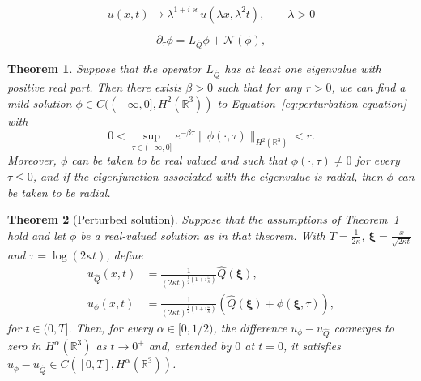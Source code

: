 \documentclass[10pt,a4paper]{amsart}
\newtheorem{theorem}{Theorem}
\begin{document}
\begin{equation}\label{scaling2}
  u(x,t)\to\lambda^{1+i\varkappa}u(\lambda x,\lambda^{2}t),\qquad\lambda>0
\end{equation}

\begin{equation}\label{eq:perturbation-equation}
  \partial_\tau\phi=L_{\hat{Q}}\phi+\mathcal{N}(\phi),
\end{equation}

\begin{theorem}\label{thm:decaying-solution}
  Suppose that the operator \(L_{\hat{Q}}\) has at least one
  eigenvalue with positive real part. Then there exists \(\beta > 0\)
  such that for any \(r > 0\), we can find a mild solution
  \(\phi \in C((-\infty, 0], H^{2}(\mathbb{R}^{3}))\) to
  Equation~\eqref{eq:perturbation-equation} with
  \begin{equation*}
    0 < \sup_{\tau \in (-\infty, 0]} e^{-\beta\tau}\|\phi(\cdot, \tau)\|_{H^{2}(\mathbb{R}^{3})} < r.
  \end{equation*}
  Moreover, \(\phi\) can be taken to be real valued and such that
  \(\phi(\cdot, \tau) \neq 0\) for every \(\tau \leq 0\), and if the
  eigenfunction associated with the eigenvalue is radial, then
  \(\phi\) can be taken to be radial.
\end{theorem}

\begin{theorem}[Perturbed solution]\label{thm:perturbed-solution}
  Suppose that the assumptions of Theorem~\ref{thm:decaying-solution}
  hold and let \(\phi\) be a real-valued solution as in that theorem.
  With
  \(T = \frac{1}{2\kappa}\), \(\bm{\xi} = \frac{x}{\sqrt{2\kappa t}}\)
  and \(\tau = \log(2\kappa t)\), define
  \begin{align*}
    u_{\hat{Q}}(x, t) &= \frac{1}{(2\kappa t)^{\frac{1}{2}\left(1 + i\frac{\omega}{\kappa}\right)}}\hat{Q}(\bm{\xi}),\\
    u_{\phi}(x, t) &= \frac{1}{(2\kappa t)^{\frac{1}{2}\left(1 + i\frac{\omega}{\kappa}\right)}}\left(\hat{Q}(\bm{\xi}) + \phi(\bm{\xi}, \tau)\right),
  \end{align*}
  for \(t \in (0, T]\). Then, for every \(\alpha \in [0, 1 / 2)\), the
  difference \(u_{\phi} - u_{\hat{Q}}\) converges to zero in
  \(H^{\alpha}(\mathbb{R}^{3})\) as \(t \to 0^{+}\) and, extended by
  \(0\) at \(t = 0\), it satisfies
  \(u_{\phi} - u_{\hat{Q}} \in C([0, T], H^{\alpha}(\mathbb{R}^{3}))\).
\end{theorem}
\end{document}
